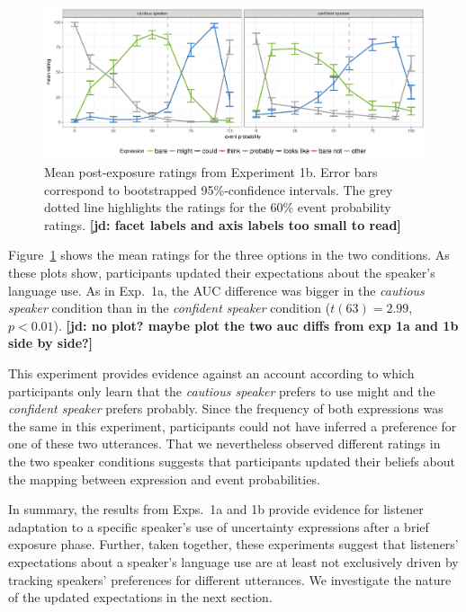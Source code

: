 \documentclass[lucida,biblatex]{sp} %
\newcommand{\jd}[1]{\textcolor{PinkyPurple}{\textbf{[jd: #1]}}}
\begin{document}
\begin{figure}
\includegraphics[width=\textwidth]{plots/exp-1-replication-ratings.pdf}
\caption{Mean post-exposure ratings from Experiment 1b. Error bars correspond to bootstrapped 95\%-confidence intervals.  The grey dotted line highlights the ratings for the 60\% event probability ratings. \jd{facet labels and axis labels too small to read} \label{fig:adaptation-results-prod2}}
\end{figure}

Figure~\ref{fig:adaptation-results-prod2} shows the mean ratings for the three options in the two conditions. As these plots show, participants updated their expectations about the speaker's language use. As in Exp.~1a, the
AUC difference was bigger in the \emph{cautious speaker} condition than in the \emph{confident speaker} condition ($t(63) = 2.99$, $p < 0.01$). \jd{no plot? maybe plot the two auc diffs from exp 1a and 1b side by side?}

This experiment provides evidence against an account according to which participants only learn that the \emph{cautious speaker} prefers to use {\sc might} and the {\it confident speaker} prefers {\sc probably}. 
Since the frequency of both expressions was the same in this experiment, participants could not have inferred a preference for one of these two utterances. That we nevertheless observed different ratings in the two speaker conditions suggests that participants updated their beliefs about the mapping between expression and event probabilities.

In summary, the results from Exps.~1a and 1b provide evidence for listener adaptation to a specific speaker's use of uncertainty expressions after a brief exposure phase. Further, taken together, these experiments
suggest that listeners' expectations about a speaker's language use are at least not exclusively driven by tracking speakers' preferences for different utterances. We investigate the nature of the updated expectations
in the next section.
\end{document}
